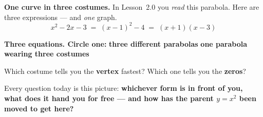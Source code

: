 \boxguard[18]
\begin{hookbox}
\small
\begin{minipage}[c]{0.52\linewidth}
\textbf{One curve in three costumes.} In Lesson~2.0 you \emph{read} this parabola. Here are
three expressions --- and \emph{one} graph.
\[ x^2-2x-3 \;=\; (x-1)^2-4 \;=\; (x+1)(x-3) \]
\end{minipage}\hfill
\begin{minipage}[c]{0.44\linewidth}\centering
{}
\end{minipage}
\par\vspace{5pt}
\textbf{Three equations. Circle one:} \quad \textbf{three different parabolas} \qquad
\textbf{one parabola wearing three costumes}
\par\vspace{4pt}
Which costume tells you the \textbf{vertex} fastest? \blank{4.0cm} \quad Which one tells you the
\textbf{zeros}? \blank{4.0cm}
\par\vspace{4pt}
Every question today is this picture: \textbf{whichever form is in front of you, what does it
hand you for free --- and how has the parent $y=x^2$ been moved to get here?}
\end{hookbox}

